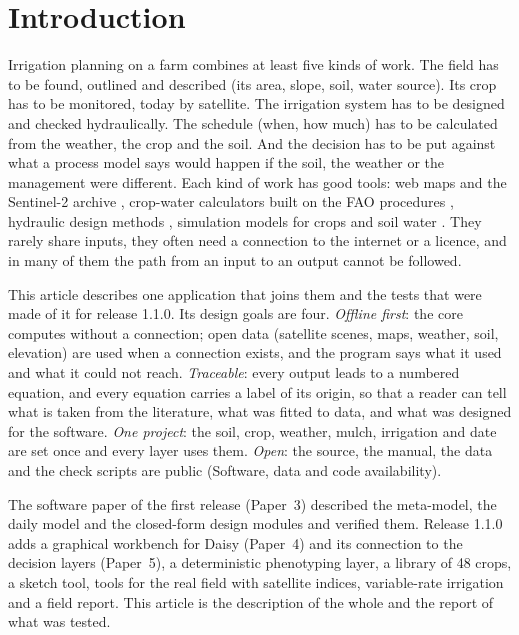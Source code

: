 \section{Introduction}
Irrigation planning on a farm combines at least five kinds of work. The field has to be found, outlined and described (its area, slope, soil, water source). Its crop has to be monitored, today by satellite. The irrigation system has to be designed and checked hydraulically. The schedule (when, how much) has to be calculated from the weather, the crop and the soil. And the decision has to be put against what a process model says would happen if the soil, the weather or the management were different. Each kind of work has good tools: web maps and the Sentinel-2 archive \citep{Drusch2012}, crop-water calculators built on the FAO procedures \citep{Allen1998,Doorenbos1979}, hydraulic design methods \citep{Keller1990,Walker1989}, simulation models for crops and soil water \citep{Jones2003,Keating2003,Steduto2009,Simunek2008,Hansen2012}. They rarely share inputs, they often need a connection to the internet or a licence, and in many of them the path from an input to an output cannot be followed.

This article describes one application that joins them and the tests that were made of it for release 1.1.0. Its design goals are four. \emph{Offline first}: the core computes without a connection; open data (satellite scenes, maps, weather, soil, elevation) are used when a connection exists, and the program says what it used and what it could not reach. \emph{Traceable}: every output leads to a numbered equation, and every equation carries a label of its origin, so that a reader can tell what is taken from the literature, what was fitted to data, and what was designed for the software. \emph{One project}: the soil, crop, weather, mulch, irrigation and date are set once and every layer uses them. \emph{Open}: the source, the manual, the data and the check scripts are public (Software, data and code availability).

The software paper of the first release (Paper~3) described the meta-model, the daily model and the closed-form design modules and verified them. Release 1.1.0 adds a graphical workbench for Daisy (Paper~4) and its connection to the decision layers (Paper~5), a deterministic phenotyping layer, a library of 48 crops, a sketch tool, tools for the real field with satellite indices, variable-rate irrigation and a field report. This article is the description of the whole and the report of what was tested.

